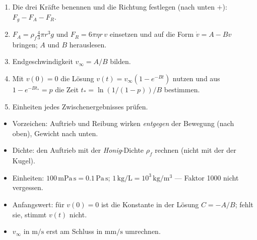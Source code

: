 \begin{werkzeugkasten}
\begin{enumerate}
  \item Die drei Kräfte benennen und die Richtung festlegen (nach unten $+$):
        $F_g - F_A - F_R$.
  \item $F_A=\rho_f\frac43\pi r^3 g$ und $F_R=6\pi\eta r\,v$ einsetzen und auf
        die Form $\dot v = A - B v$ bringen; $A$ und $B$ herauslesen.
  \item Endgeschwindigkeit $v_\infty=A/B$ bilden.
  \item Mit $v(0)=0$ die Lösung $v(t)=v_\infty(1-e^{-Bt})$ nutzen und aus
        $1-e^{-Bt_*}=p$ die Zeit $t_*=\ln(1/(1-p))/B$ bestimmen.
  \item Einheiten jedes Zwischenergebnisses prüfen.
\end{enumerate}
\end{werkzeugkasten}

\begin{achtung}
\begin{itemize}
  \item Vorzeichen: Auftrieb und Reibung wirken \emph{entgegen} der Bewegung
       (nach oben), Gewicht nach unten.
  \item Dichte: den Auftrieb mit der \emph{Honig}-Dichte $\rho_f$ rechnen
       (nicht mit der der Kugel).
  \item Einheiten: $100\,\mathrm{mPa\,s}=0.1\,\mathrm{Pa\,s}$;
       $1\,\mathrm{kg/L}=10^3\,\mathrm{kg/m^3}$ --- Faktor 1000 nicht vergessen.
  \item Anfangswert: für $v(0)=0$ ist die Konstante in der Lösung
       $C=-A/B$; fehlt sie, stimmt $v(t)$ nicht.
  \item $v_\infty$ in $\mathrm{m/s}$ erst am Schluss in $\mathrm{mm/s}$
       umrechnen.
\end{itemize}
\end{achtung}
